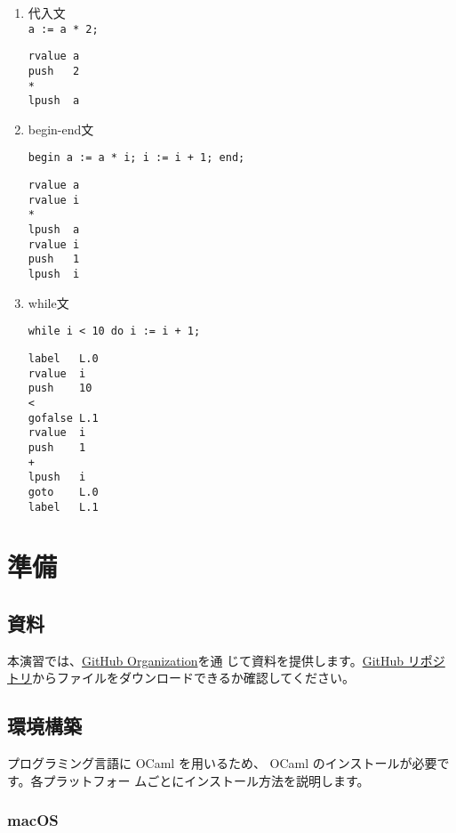 \documentclass[a4paper,11pt]{jsarticle}
\begin{document}
\begin{enumerate}
\item 代入文 \\
   \texttt{a := a * 2;} \\
  \begin{lstlisting}
rvalue a
push   2
*
lpush  a
  \end{lstlisting}

\item begin-end文

   \texttt{begin a := a * i; i := i + 1; end;}

  \begin{lstlisting}
rvalue a
rvalue i
*
lpush  a
rvalue i
push   1
lpush  i
  \end{lstlisting}

\item while文

   \texttt{while i < 10 do i := i + 1;}


\begin{lstlisting}
label	L.0
rvalue	i
push	10
<
gofalse	L.1
rvalue	i
push	1
+
lpush	i
goto	L.0
label	L.1
  \end{lstlisting}

\end{enumerate}

\section{準備}

\subsection{資料}

本演習では、\href{https://github.com/tmu-compiler-info-sys-exp-I}{GitHub Organization}を通
じて資料を提供します。\href{https://github.com/tmu-compiler-info-sys-exp-I/resume}{GitHub
  リポジトリ}からファイルをダウンロードできるか確認してください。

\subsection{環境構築}

プログラミング言語に OCaml を用いるため、 OCaml のインストールが必要です。各プラットフォー
ムごとにインストール方法を説明します。

\subsubsection{macOS}
\end{document}
